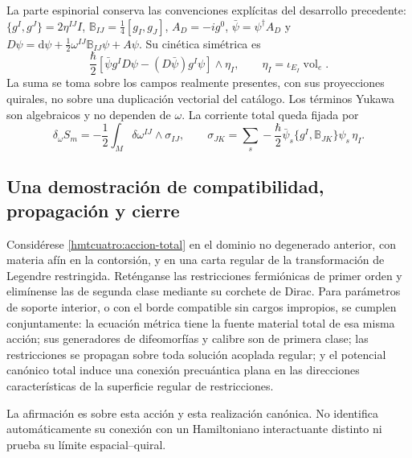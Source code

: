 La parte espinorial conserva las convenciones explícitas del desarrollo
precedente: \(\{g^I,g^J\}=2\eta^{IJ}I\),
\(\mathbb B_{IJ}=\frac14[g_I,g_J]\), \(A_D=-ig^0\),
\(\bar\psi=\psi^\dagger A_D\) y
\(D\psi=\mathrm d\psi+\frac12\omega^{IJ}\mathbb B_{IJ}\psi+A\psi\).
Su cinética simétrica es
\[
 \frac{\hbar}{2}
 [\bar\psi g^I D\psi-(D\bar\psi)g^I\psi]\wedge\eta_I,
 \qquad \eta_I=\iota_{E_I}\operatorname{vol}_e .
\]
La suma se toma sobre los campos realmente presentes, con sus
proyecciones quirales, no sobre una duplicación vectorial del catálogo.
Los términos Yukawa son algebraicos y no dependen de \(\omega\).
La corriente total queda fijada por
\begin{equation}
 \delta_\omega S_m=-\frac12\int_M\delta\omega^{IJ}\wedge\sigma_{IJ},
 \qquad
 \sigma_{JK}=\sum_s-\frac{\hbar}{2}
   \bar\psi_s\{g^I,\mathbb B_{JK}\}\psi_s\,\eta_I.
 \label{hmtcuatro:corriente-total}
\end{equation}

\subsection{Una demostración de compatibilidad, propagación y cierre}
\label{hmtcuatro:demostracion-unica}

\begin{theorem}
\label{hmtcuatro:teorema-canonico-total}
Considérese \eqref{hmtcuatro:accion-total} en el dominio no degenerado
anterior, con materia afín en la contorsión, y en una carta regular de
la transformación de Legendre restringida. Reténganse las restricciones
fermiónicas de primer orden y elimínense las de segunda clase mediante
su corchete de Dirac. Para parámetros de soporte interior, o con el
borde compatible sin cargos impropios, se cumplen conjuntamente:
la ecuación métrica tiene la fuente material total de esa misma acción;
sus generadores de difeomorfías y calibre son de primera clase; las
restricciones se propagan sobre toda solución acoplada regular; y el
potencial canónico total induce una conexión precuántica plana en las
direcciones características de la superficie regular de restricciones.

La afirmación es sobre esta acción y esta realización canónica.
No identifica automáticamente su conexión con un Hamiltoniano
interactuante distinto ni prueba su límite espacial--quiral.
\end{theorem}

